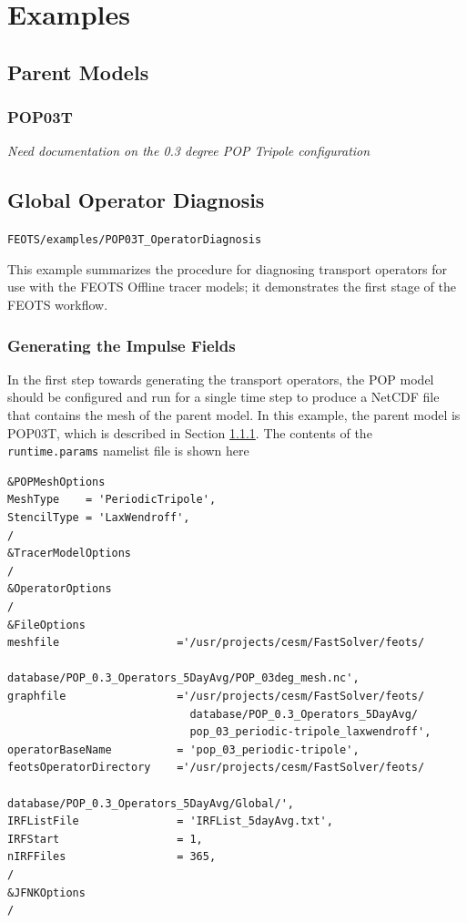 \documentclass{softwaremanual}
\begin{document}
\chapter{Examples} \label{chapter:examples}

\section{Parent Models}
\subsection{POP03T} \label{sec:POP03T}
\textit{Need documentation on the 0.3 degree POP Tripole configuration}

\section{Global Operator Diagnosis}\label{sec:GlobalOperatorDiagnosis}
\begin{center}
\texttt{FEOTS/examples/POP03T\_OperatorDiagnosis}
\end{center}
This example summarizes the procedure for diagnosing transport operators for use with the FEOTS Offline tracer models; it demonstrates the first stage of the FEOTS workflow.

\subsection{Generating the Impulse Fields}
In the first step towards generating the transport operators, the POP model should be configured and run for a single time step to produce a NetCDF file that contains the mesh of the parent model. In this example, the parent model is POP03T, which is described in Section \ref{sec:POP03T}. The contents of the \texttt{runtime.params} namelist file is shown here 
\begin{verbatim}
&POPMeshOptions
MeshType    = 'PeriodicTripole',
StencilType = 'LaxWendroff',
/
&TracerModelOptions
/
&OperatorOptions
/
&FileOptions
meshfile                  ='/usr/projects/cesm/FastSolver/feots/
                            database/POP_0.3_Operators_5DayAvg/POP_03deg_mesh.nc',
graphfile                 ='/usr/projects/cesm/FastSolver/feots/
                            database/POP_0.3_Operators_5DayAvg/
                            pop_03_periodic-tripole_laxwendroff',
operatorBaseName          = 'pop_03_periodic-tripole',
feotsOperatorDirectory    ='/usr/projects/cesm/FastSolver/feots/
                            database/POP_0.3_Operators_5DayAvg/Global/',
IRFListFile               = 'IRFList_5dayAvg.txt',
IRFStart                  = 1,
nIRFFiles                 = 365,
/
&JFNKOptions
/
\end{verbatim}
\end{document}
